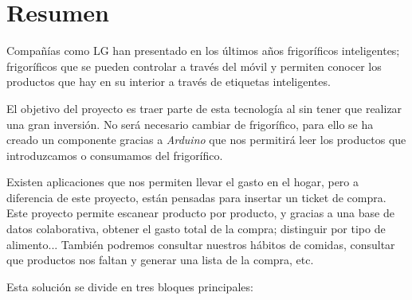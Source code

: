 \chapter*{Resumen}

Compañías como LG han presentado en los últimos años frigoríficos inteligentes; frigoríficos que se pueden controlar a través del móvil y permiten conocer los productos que hay en su interior a través de etiquetas inteligentes.

El objetivo del proyecto es traer parte de esta tecnología al sin tener que realizar una gran inversión. No será necesario cambiar de frigorífico, para ello se ha creado un componente gracias a \emph{Arduino} que nos permitirá leer los productos que introduzcamos o consumamos del frigorífico.

Existen aplicaciones que nos permiten llevar el gasto en el hogar, pero a diferencia de este proyecto, están pensadas para insertar un ticket de compra. Este proyecto permite escanear producto por producto, y gracias a una base de datos colaborativa, obtener el gasto total de la compra; distinguir por tipo de alimento... También podremos consultar nuestros hábitos de comidas, consultar que productos nos faltan y generar una lista de la compra, etc.

Esta solución se divide en tres bloques principales:

